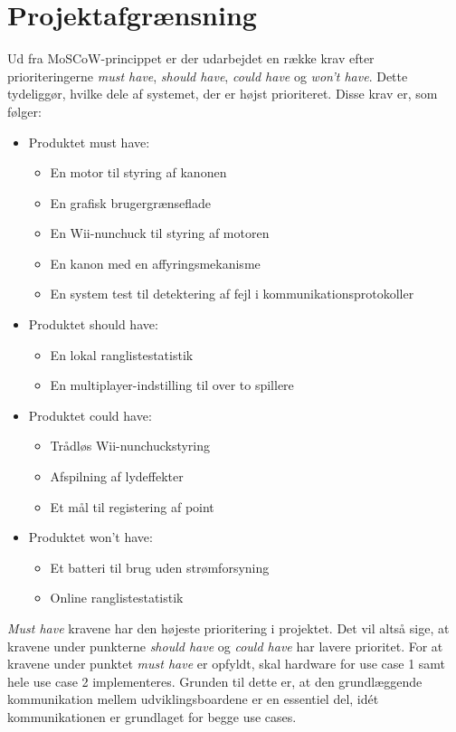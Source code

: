 \chapter{Projektafgrænsning}
\label{afsnit:Projektafgraensning}
Ud fra MoSCoW-princippet \cite{moscow} er der udarbejdet en række krav efter prioriteringerne \textit{must have}, \textit{should have}, \textit{could have} og \textit{won't have}. Dette tydeliggør, hvilke dele af systemet, der er højst prioriteret. Disse krav er, som følger:

\begin{itemize}
	\item Produktet must have:
	\begin{itemize}
		\item En motor til styring af kanonen
		\item En grafisk brugergrænseflade
		\item En Wii-nunchuck til styring af motoren
		\item En kanon med en affyringsmekanisme
		\item En system test til detektering af fejl i kommunikationsprotokoller
	\end{itemize}
	\item Produktet should have:
	\begin{itemize}
		\item En lokal ranglistestatistik
		\item En multiplayer-indstilling til over to spillere
	\end{itemize}
	\item Produktet could have:
	\begin{itemize}
		\item Trådløs Wii-nunchuckstyring
		\item Afspilning af lydeffekter
		\item Et mål til registering af point
	\end{itemize}
	\item Produktet won't have:
	\begin{itemize}
		\item Et batteri til brug uden strømforsyning
		\item Online ranglistestatistik
	\end{itemize}
\end{itemize}

\noindent \textit{Must have} kravene har den højeste prioritering i projektet. Det vil altså sige, at kravene under punkterne \textit{should have} og \textit{could have} har lavere prioritet. For at kravene under punktet \textit{must have} er opfyldt, skal hardware for use case 1 samt hele use case 2 implementeres. Grunden til dette er, at den grundlæggende kommunikation mellem udviklingsboardene er en essentiel del, idét kommunikationen er grundlaget for begge use cases.
